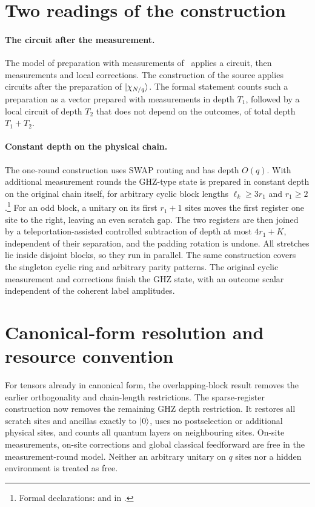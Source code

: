 \documentclass{article}
\begin{document}
\section{Two readings of the construction}
\paragraph{The circuit after the measurement.}
The model of preparation with measurements of~\cite{Piroli2021LOCC} applies a
circuit, then measurements and local corrections. The construction of the
source applies circuits after the preparation of $|\chi_{N/q}\rangle$. The formal
statement counts such a preparation as a vector prepared with measurements in
depth $T_1$, followed by a local circuit of depth $T_2$ that does not depend on
the outcomes, of total depth $T_1+T_2$.

\paragraph{Constant depth on the physical chain.}
The one-round construction uses SWAP routing and has depth $O(q)$. With
additional measurement rounds the GHZ-type state is prepared in constant
depth on the original chain itself, for arbitrary cyclic block lengths
$\ell_k\ge3r_1$ and $r_1\ge2$.\footnote{Formal declarations:
    and 
    in .}
For an odd block, a unitary on its first $r_1+1$ sites moves the first
register one site to the right, leaving an even scratch gap. The two
registers are then joined by a teleportation-assisted controlled subtraction
of depth at most $4r_1+K$, independent of their separation, and the padding rotation
is undone. All stretches lie inside disjoint blocks, so they run in parallel.
The same construction covers the singleton cyclic ring and arbitrary parity
patterns. The original cyclic measurement and corrections finish the GHZ
state, with an outcome scalar independent of the coherent label amplitudes.

\section{Canonical-form resolution and resource convention}
For tensors already in canonical form, the overlapping-block result removes
the earlier orthogonality and chain-length restrictions. The sparse-register
construction now removes the remaining GHZ depth restriction. It restores
all scratch sites and ancillas exactly to $|0\rangle$, uses no postselection or
additional physical sites, and counts all quantum layers on neighbouring
sites. On-site measurements, on-site corrections and global classical
feedforward are free in the measurement-round model. Neither an arbitrary
unitary on $q$ sites nor a hidden environment is treated as free.
\end{document}
